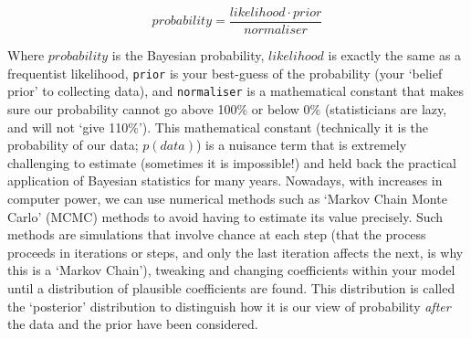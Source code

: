 \documentclass[11pt]{article}
\begin{document}
{\begin{equation}
  probability = \frac{likelihood \cdot prior}{normaliser}
  \label{bayes_theorem}
\end{equation}

Where $probability$ is the Bayesian probability, $likelihood$ is exactly the same as a frequentist likelihood, \texttt{prior} is your best-guess of the probability (your `belief prior' to collecting data), and \texttt{normaliser} is a mathematical constant that makes sure our probability cannot go above 100\% or below 0\% (statisticians are lazy, and will not `give 110\%'). This mathematical constant (technically it is the probability of our data; $p(data)$) is a nuisance term that is extremely challenging to estimate (sometimes it is impossible!) and held back the practical application of Bayesian statistics for many years. Nowadays, with increases in computer power, we can use numerical methods such as `Markov Chain Monte Carlo' (MCMC) methods to avoid having to estimate its value precisely. Such methods are simulations  that involve chance at each step (that the process proceeds in iterations or steps, and only the last iteration affects the next, is why this is a `Markov Chain'), tweaking and changing coefficients within your model until a distribution of plausible coefficients are found. This distribution is called the `posterior' distribution to distinguish how it is our view of probability \emph{after} the data and the prior have been considered. %


}
\end{document}
